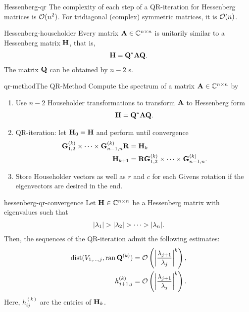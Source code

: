 \begin{Corollary}{Hessenberg-qr}
  The complexity of each step of a QR-iteration for Hessenberg matrices is $\bigo(n^2)$. For tridiagonal (complex) symmetric matrices, it is $\bigo(n)$.
\end{Corollary}

\begin{Theorem}{Hessenberg-householder}
  Every matrix $\mata\in\Cnn$ is unitarily similar to a Hessenberg matrix $\matH$, that is,
  \begin{gather}
    \matH = \matq^* \mata \matq.
  \end{gather}
  The matrix $\matq$ can be obtained by $n-2$ s.
\end{Theorem}

\begin{Algorithm*}{qr-method}{The QR-Method}
  Compute the spectrum of a matrix $\mata\in\Cnn$ by
  \begin{enumerate}
  \item Use $n-2$ Householder transformations to transform $\mata$ to
    Hessenberg form
    \begin{gather}
     \matH = \matq^*\mata\matq.
   \end{gather}
 \item QR-iteration: let $\matH_{0}=\matH$ and perform until convergence
   \begin{align}
     \givens^{(k)}_{1,2}\times\dots\times\givens^{(k)}_{n-1,n} \matr &= \matH_k\\
     \matH_{k+1} &= \matr \givens^{(k)}_{1,2}\times\dots\times\givens^{(k)}_{n-1,n}.
   \end{align}
 \item Store Householder vectors as well as $r$ and $c$ for each
   Givens rotation if the eigenvectors are desired in the end.
  \end{enumerate}
\end{Algorithm*}

\begin{Theorem}{hessenberg-qr-convergence}
    Let $\matH\in\Cnn$ be a Hessenberg matrix with eigenvalues such that
  \begin{gather}
    \abs{\lambda_1} >
    \abs{\lambda_2}>\dots>\abs{\lambda_n}.
  \end{gather}
  Then, the sequences of the QR-iteration admit the following estimates:
  \begin{align}
    \dist(\esp{1,\dots,j},\ran{\matq^{(k)}}) &= \bigo \left(\abs*{\frac{\lambda_{j+1}}{\lambda_j}}^k\right),
    \\
    h_{j+1,j}^{(k)} &= \bigo \left(\abs*{\frac{\lambda_{j+1}}{\lambda_j}}^k\right)
                      .
  \end{align}
  Here, $h_{ij}^{(k)}$ are the entries of $\matH_k$.
\end{Theorem}

